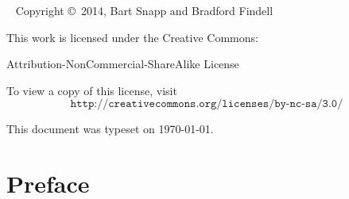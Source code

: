 

\newpage

\begin{fullwidth}
~\vfill
\thispagestyle{empty}
\setlength{\parindent}{0pt}
\setlength{\parskip}{\baselineskip}
Copyright \copyright~2014, Bart Snapp and Bradford Findell

\vspace{.5cm}

\noindent
This work is licensed under the Creative Commons:
\begin{center}
Attribution-NonCommercial-ShareAlike License 
\end{center}
To view a copy of this license, visit
\[
\texttt{http://creativecommons.org/licenses/by-nc-sa/3.0/}
\]


\vspace{.5cm}
\noindent This document was typeset on \today.
\end{fullwidth}


\chapter*{Preface}


